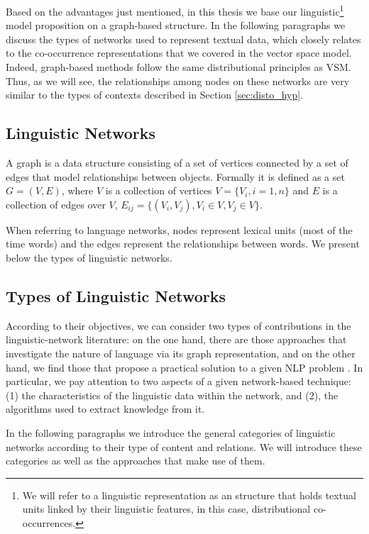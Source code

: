 Based on the  advantages just mentioned, in this thesis we base our linguistic\footnote{We will refer to a linguistic representation as an structure that holds textual units linked by their linguistic features, in this case, distributional co-occurrences.} model proposition on a graph-based structure. In the following paragraphs we discuss the types of networks used to represent textual data, which closely relates to the co-occurrence representations that we covered in the vector space model. Indeed, graph-based methods follow the same distributional principles as VSM. Thus, as we will see, the relationships among nodes on these networks are very similar to the types of contexts described in Section \ref{sec:disto_hyp}.


\subsection{Linguistic Networks}
A graph is a data structure consisting of a set of vertices connected by
a set of edges that  model relationships between objects.
Formally it is defined as a set $G=(V,E)$, where $V$ is a
collection of vertices $V=\{V_i,i=1,n\}$ and $E$ is a collection of
edges over $V$, $E_{ij}=\{(V_i,V_j),V_i \in V, V_j \in V\}$. 

When referring to language networks, nodes represent lexical units (most of the time words) and the edges represent the relationships between words. We present below the types of linguistic networks. 

\subsection{Types of Linguistic Networks}

According to their objectives, we can consider two types of contributions in the linguistic-network literature: on the one hand, there are those approaches that investigate the nature of language via its graph representation, and on the other hand, we find those that propose a practical solution to a given NLP problem  \cite{Choudhury2009}. In particular, we pay attention to two aspects of a given network-based technique: (1) the  characteristics of the linguistic data within the network, and (2), the  algorithms used to extract knowledge from it.


In the following paragraphs we introduce the general categories of linguistic networks according to their type of content and relations. We will introduce these categories as well as the  approaches that make use of them.

